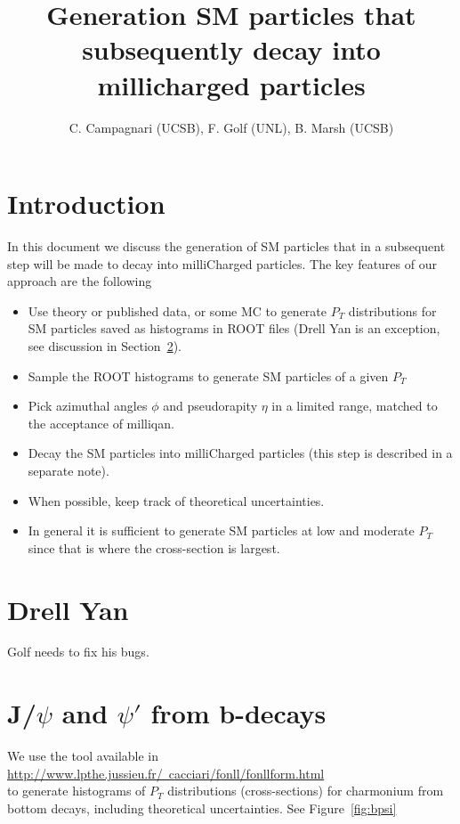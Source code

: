 \documentclass[12pt]{article}
\title{Generation SM particles that subsequently decay into millicharged particles}
\author{C. Campagnari (UCSB), F. Golf (UNL), B. Marsh (UCSB)}
\begin{document}
\maketitle


\section{Introduction}
In this document we discuss the generation of SM particles that in 
a subsequent step will be made to decay into milliCharged particles.
The key features of our approach are the following
\begin{itemize}
\item Use theory or published data, or some MC to generate $P_T$ distributions for SM
  particles
saved as histograms in ROOT files (Drell Yan is an exception, see
discussion in Section~\ref{sec:DY}).
\item Sample the ROOT histograms to generate SM particles of a 
given $P_T$
\item Pick azimuthal angles $\phi$ and pseudorapity $\eta$ in a
  limited 
range, matched to the acceptance of milliqan.
\item Decay the SM particles into milliCharged particles (this 
step is described in a separate note).  
\item When possible, keep track of theoretical uncertainties.
\item In general it is sufficient to generate SM particles at low 
and moderate $P_T$ since that is where the cross-section is largest.
\end{itemize}

\section{Drell Yan}
\label{sec:DY}

Golf needs to fix his bugs.

\section{J/$\psi$ and $\psi'$ from b-decays}
\label{sec:bpsi}
We use the tool available in \\
\href{http://www.lpthe.jussieu.fr/~cacciari/fonll/fonllform.html}
{http://www.lpthe.jussieu.fr/~cacciari/fonll/fonllform.html} \\
to
generate histograms of $P_T$ distributions (cross-sections) for charmonium from 
bottom decays, including theoretical 
uncertainties\cite{Cacciari:2012ny,Cacciari:2015fta}.  
See Figure~\ref{fig:bpsi} 
\end{document}
